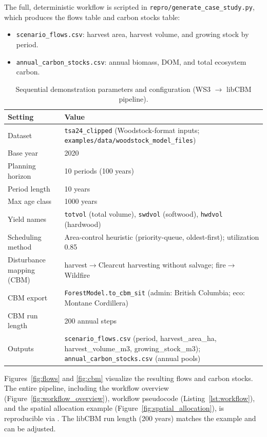 \documentclass[review]{elsarticle}
\begin{document}
The full, deterministic workflow is scripted in \texttt{repro/generate\_case\_study.py}, which produces the flows table and carbon stocks table:
\begin{itemize}
  \item \texttt{scenario\_flows.csv}: harvest area, harvest volume, and growing stock by period.
  \item \texttt{annual\_carbon\_stocks.csv}: annual biomass, DOM, and total ecosystem carbon.
\end{itemize}
\begin{table}[h]
\centering
\caption{Sequential demonstration parameters and configuration (WS3 $\to$ libCBM pipeline).}
\begin{tabular}{p{4.2cm}p{9.5cm}}
\toprule
Setting & Value \\
\midrule
Dataset & \texttt{tsa24\_clipped} (Woodstock-format inputs; \texttt{examples/data/woodstock\_model\_files}) \\
Base year & 2020 \\
Planning horizon & 10 periods (100 years) \\
Period length & 10 years \\
Max age class & 1000 years \\
Yield names & \texttt{totvol} (total volume), \texttt{swdvol} (softwood), \texttt{hwdvol} (hardwood) \\
Scheduling method & Area-control heuristic (priority-queue, oldest-first); utilization 0.85 \\
Disturbance mapping (CBM) & harvest$\to$Clearcut harvesting without salvage; fire$\to$Wildfire \\
CBM export & \texttt{ForestModel.to\_cbm\_sit} (admin: British Columbia; eco: Montane Cordillera) \\
CBM run length & 200 annual steps \\
Outputs & \texttt{scenario\_flows.csv} (period, harvest\_area\_ha, harvest\_volume\_m3, growing\_stock\_m3); \texttt{annual\_carbon\_stocks.csv} (annual pools) \\
\bottomrule
\end{tabular}
\label{tab:case_params}
\end{table}

Figures~\ref{fig:flows} and \ref{fig:cbm} visualize the resulting flows and carbon stocks. The entire pipeline, including the workflow overview (Figure~\ref{fig:workflow_overview}), workflow pseudocode (Listing~\ref{lst:workflow}), and the spatial allocation example (Figure~\ref{fig:spatial_allocation}), is reproducible via . The libCBM run length (200 years) matches the example and can be adjusted.
\end{document}
